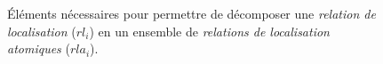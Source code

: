\begin{figure}
  \centering
   
  \caption{Éléments nécessaires pour permettre de décomposer une
    \emph{relation de localisation} ($rl_i$) en un ensemble de
    \emph{relations de localisation atomiques} ($rla_i$).}
  \label{fig:onto_min_struct}
\end{figure}


